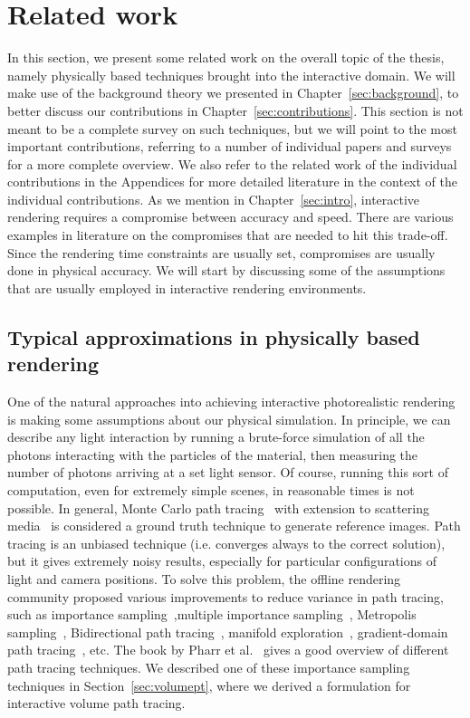 \chapter{Related work}



%
\label{sec:related}
%
In this section, we present some related work on the overall topic of the thesis, namely physically based techniques brought into the interactive domain. We will make use of the background theory we presented in Chapter~\ref{sec:background}, to better discuss our contributions in Chapter~\ref{sec:contributions}. This section is not meant to be a complete survey on such techniques, but we will point to the most important contributions, referring to a number of individual papers and surveys for a more complete overview. We also refer to the related work of the individual contributions in the Appendices for more detailed literature in the context of the individual contributions. 
%
As we mention in Chapter~\ref{sec:intro}, interactive rendering requires a compromise between accuracy and speed. There are various examples in literature on the compromises that are needed to hit this trade-off. Since the rendering time constraints are usually set, compromises are usually done in physical accuracy. We will start by discussing some of the assumptions that are usually employed in interactive rendering environments. 
%
\section{Typical approximations in physically based rendering}

One of the natural approaches into achieving interactive photorealistic rendering is making some assumptions about our physical simulation. In principle, we can describe any light interaction by running a brute-force simulation of all the photons interacting with the particles of the material, then measuring the number of photons arriving at a set light sensor. Of course, running this sort of computation, even for extremely simple scenes, in reasonable times is not possible. In general, Monte Carlo path tracing~\cite{Kajiya1986} with extension to scattering media~\cite{Rushmeier1988} is considered a ground truth technique to generate reference images. Path tracing is an unbiased technique (i.e. converges always to the correct solution), but it gives extremely noisy results, especially for particular configurations of light and camera positions. To solve this problem, the offline rendering community proposed various improvements to reduce variance in path tracing, such as importance sampling~\cite{Kirk1991},multiple importance sampling~\cite{Veach1995}, Metropolis sampling~\cite{Veach1995}, Bidirectional path tracing~\cite{Veach1997}, manifold exploration~\cite{Jakob2012}, gradient-domain path tracing~\cite{Kettunen2015}, etc. The book by Pharr et al.~\cite{Pharr2017} gives a good overview of different path tracing techniques. We described one of these importance sampling techniques in Section~\ref{sec:volumept}, where we derived a formulation for interactive volume path tracing.

